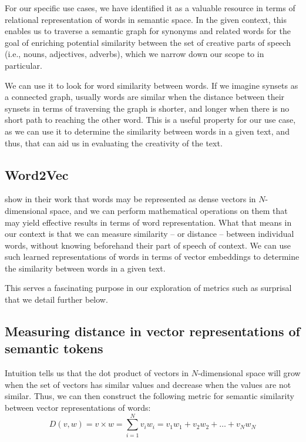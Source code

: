 For our specific use cases, we have identified it as a valuable resource in terms of relational representation of words in semantic space. In the given context, this enables us to traverse a semantic graph for synonyms and related words for the goal of enriching potential similarity between the set of creative parts of speech (i.e., nouns, adjectives, adverbs), which we narrow down our scope to in particular. 

We can use it to look for word similarity between words. If we imagine synsets as a connected graph, usually words are similar when the distance between their synsets in terms of traversing the graph is shorter, and longer when there is no short path to reaching the other word. This is a useful property for our use case, as we can use it to determine the similarity between words in a given text, and thus, that can aid us in evaluating the creativity of the text.


\subsection{Word2Vec}\label{sec:word2vec}

\citet*{mikolov_word2vec_2013} show in their work that words may be represented as dense vectors in $N$-dimensional space, and we can perform mathematical operations on them that may yield effective results in terms of word representation. What that means in our context is that we can measure similarity -- or distance -- between individual words, without knowing beforehand their part of speech of context. We can use such learned representations of words in terms of vector embeddings to determine the similarity between words in a given text.

This serves a fascinating purpose in our exploration of metrics such as surprisal that we detail further below. 

\subsection*{Measuring distance in vector representations of semantic tokens}
Intuition tells us that the dot product of vectors in $N$-dimensional space will grow when the set of vectors has similar values and decrease when the values are not similar. Thus, we can then construct the following metric for semantic similarity between vector representations of words:
$$ D(v,w) = v \times w = \sum_{i=1}^{N} v_i w_i = v_1 w_1 + v_2 w_2 + \dots + v_N w_N $$ 

